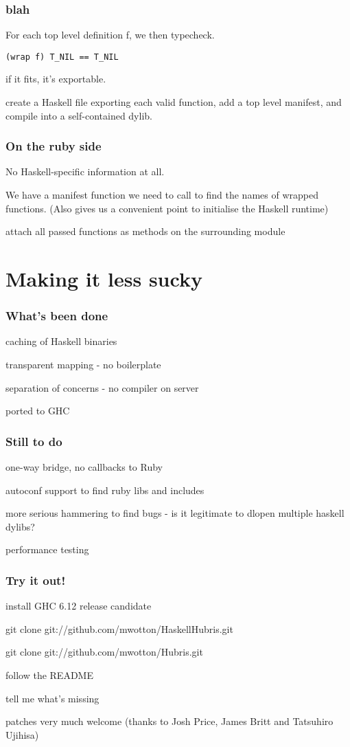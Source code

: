 \documentclass{beamer}
\begin{document}
\begin{frame}[fragile]
  \frametitle{blah}
  For each top level definition f, we then typecheck. 
\begin{lstlisting}
(wrap f) T_NIL == T_NIL 
\end{lstlisting}
if it fits, it's exportable.

  create a Haskell file exporting each valid function, add a top level
  manifest, and compile into a self-contained dylib.

\end{frame}

\begin{frame}
 \frametitle{On the ruby side}
 No Haskell-specific information at all.

 We have a manifest function we need to call to find the names of
 wrapped functions. (Also gives us a convenient point to initialise
 the Haskell runtime)

 attach all passed functions as methods on the surrounding module

\end{frame}


\section{Making it less sucky}
\begin{frame}
\setlength\parskip{0.1in}
\frametitle{What's been done}
  caching of Haskell binaries

  transparent mapping - no boilerplate

  separation of concerns - no compiler on server

  ported to GHC
\end{frame}

\begin{frame}
\frametitle{Still to do}
  one-way bridge, no callbacks to Ruby

  autoconf support to find ruby libs and includes

  more serious hammering to find bugs - is it legitimate to dlopen
  multiple haskell dylibs?

  performance testing

\end{frame}


\begin{frame}
\frametitle{Try it out!}
  install GHC 6.12 release candidate

  git clone git://github.com/mwotton/HaskellHubris.git 

  git clone git://github.com/mwotton/Hubris.git     

  follow the README

  tell me what's missing

  patches very much welcome (thanks to Josh Price, James Britt and Tatsuhiro Ujihisa)
\end{frame}
\end{document}
